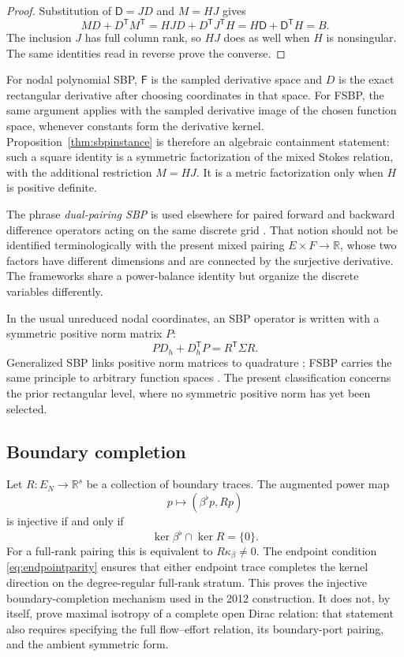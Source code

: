 \documentclass[11pt,a4paper]{article}
\theoremstyle{definition}
\theoremstyle{remark}
\newcommand{\R}{\mathbb{R}}
\newcommand{\Ker}{\operatorname{ker}}
\begin{document}
\begin{proof}
Substitution of $\mathsf D=JD$ and $M=HJ$ gives
\[
 MD+D^{\mathsf T}M^{\mathsf T}
 =HJD+D^{\mathsf T}J^{\mathsf T}H
 =H\mathsf D+\mathsf D^{\mathsf T}H=B.
\]
The inclusion $J$ has full column rank, so $HJ$ does as well when $H$ is nonsingular.  The
same identities read in reverse prove the converse.
\end{proof}

For nodal polynomial SBP, $\mathsf F$ is the sampled derivative space and $D$ is the exact
rectangular derivative after choosing coordinates in that space.  For FSBP, the same
argument applies with the sampled derivative image of the chosen function space, whenever
constants form the derivative kernel.  Proposition~\ref{thm:sbpinstance} is therefore an
algebraic containment statement: such a square identity is a symmetric factorization of the
mixed Stokes relation, with the additional restriction $M=HJ$.  It is a metric factorization
only when $H$ is positive definite.

The phrase \emph{dual-pairing SBP} is used elsewhere for paired forward and backward
difference operators acting on the same discrete grid \cite{williamsduru2024}.  That notion
should not be identified terminologically with the present mixed pairing
$E\times F\to\R$, whose two factors have different dimensions and are connected by the
surjective derivative.  The frameworks share a power-balance identity but organize the
discrete variables differently.

In the usual unreduced nodal coordinates, an SBP operator is written with a symmetric
positive norm matrix $P$:
\[
 PD_h+D_h^{\mathsf T}P=R^{\mathsf T}\Sigma R.
\]
Generalized SBP links positive norm matrices to quadrature
\cite{hickenzingg2013,delrey2014}; FSBP carries the same principle to arbitrary function
spaces \cite{glaubitz2023}.  The present classification concerns the prior rectangular level,
where no symmetric positive norm has yet been selected.

\subsection{Boundary completion}

Let $R:E_N\to\R^s$ be a collection of boundary traces.  The augmented power map
\[
 p\longmapsto(\beta^\flat p,Rp)
\]
is injective if and only if
\begin{equation}\label{eq:boundarycompletion}
 \Ker\beta^\flat\cap\Ker R=\{0\}.
\end{equation}
For a full-rank pairing this is equivalent to $R\kappa_\beta\neq0$.  The endpoint condition
\eqref{eq:endpointparity} ensures that either endpoint trace completes the kernel direction on
the degree-regular full-rank stratum.  This proves the injective boundary-completion mechanism
used in the 2012 construction.  It does not, by itself, prove maximal isotropy of a complete
open Dirac relation: that statement also requires specifying the full flow--effort relation,
its boundary-port pairing, and the ambient symmetric form.
\end{document}

